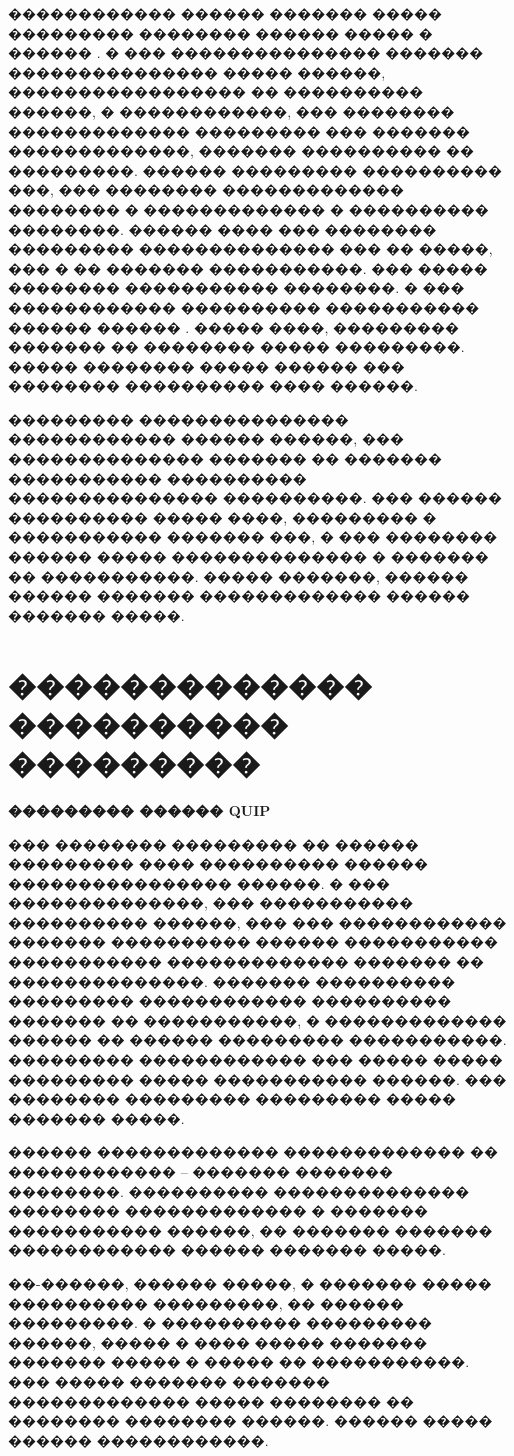 \documentclass[12pt,titlepage]{article}
\begin{document}
������������ ������ ������� ����� ��������� �������� ������ ����� � ������ \cite{Zaid2016}. � ��� ��������������� ������� ��������������� ����� ������, ����������������� �� ���������� ������, � ������������, ��� �������� ������������� ��������� ��� ������� �������������, ������� ���������� �� ���������. ������ ��������� ���������� ���, ��� �������� ������������� �������� � ������������� � ���������� ��������. ������ ���� ��� �������� ��������� �������������� ��� �� �����, ��� � �� ������� �����������. ��� ����� �������� ����������� ��������. � ��� ������������ ���������� ����������� ������ ������ \cite{Zaid2016}. ����� ����, ��������� ������� �� �������� ����� ���������. ����� �������� ����� ������ ��� �������� ���������� ���� ������.

��������� ��������������� ������������ ������ ������, ��� �������������� ������� �� ������� ����������� ���������� ��������������� ����������. ��� ������ ���������� ����� ����, ��������� � ����������� ������� ���, � ��� �������� ������ ����� �������������� � ������� �� �����������. ����� �������, ������ \cite{Zaid2016} ������ ������� ������������� ������ ������� �����.

\section{������������� ���������� ���������}

\textbf{��������� ������ QUIP}

��� �������� ��������� �� ������ ��������� ���� ���������� ������ ���������������� ������. � ��� ��������������, ��� ����������� ���������� ������, ��� ��� ������������ ������� ���������� ������ ����������� ����������� ������������� ������� �� ��������������. ������� ���������� ��������� ������������ ���������� ������� �� �����������, � ������������� ������ �� ������ ��������� �����������. ��������� ������������ ��� ����� ����� ��������� ����� ����������� ������. ��� �������� ��������� ��������� ����� ������� �����.

������ ������������� ������������� �� ������������ -- ������� ������� ��������. ���������� �������������� �������� ������������� � ������� ����������� ������, �� ������� ������� ������������ ������ ������� �����.

��-������, ������ �����, � ������� ����� ���������� ���������, �� ������ ���������. � ���������� ��������� ������, ����� � ���� ����� ������� ������� ����� � ����� �� �����������. ��� ����� ������� ������� ������������� ����� �������� �� �������� �������� ������. ������ ����� ������ ������������.
\end{document}
